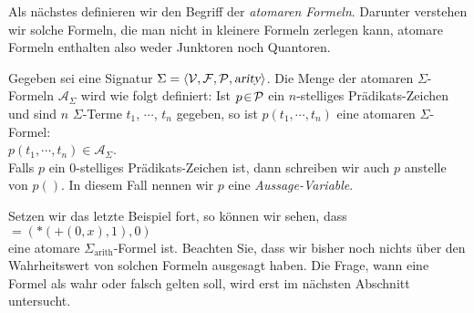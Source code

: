 Als n\"{a}chstes definieren wir den Begriff der \emph{atomaren Formeln}.  Darunter verstehen wir
solche Formeln, die man nicht in kleinere Formeln zerlegen kann, atomare Formeln enthalten also
weder Junktoren noch Quantoren. 
\begin{Definition}
  Gegeben sei eine Signatur $\Sigma = \langle \mathcal{V}, \mathcal{F}, \mathcal{P}, \textsl{arity} \rangle$. 
  Die Menge der atomaren $\Sigma$-Formeln $\mathcal{A}_\Sigma$
  wird wie folgt definiert:  Ist $p \!\in\! \mathcal{P}$ ein $n$-stelliges Pr\"{a}dikats-Zeichen
  und sind $n$ $\Sigma$-Terme $t_1$, $\cdots$, $t_n$ gegeben, so ist
  $p(t_1,\cdots,t_n)$ eine atomaren $\Sigma$-Formel: \\[0.2cm]
  \hspace*{1.3cm} $p(t_1,\cdots,t_n) \in \mathcal{A}_\Sigma$.  \\[0.2cm]
  Falls $p$ ein 0-stelliges Pr\"{a}dikats-Zeichen ist, dann schreiben wir auch $p$ anstelle von $p()$.
  In diesem Fall nennen wir $p$ eine \emph{Aussage-Variable}.
  \eox
\end{Definition}

\example
Setzen wir das letzte Beispiel fort, so k\"{o}nnen wir sehen, dass \\[0.2cm]
\hspace*{1.3cm} $\mathtt{=}(*(\mathtt{+}(0,x),1),0)$ \\[0.2cm]
eine atomare $\Sigma_\mathrm{arith}$-Formel ist.  Beachten Sie, dass wir bisher noch nichts \"{u}ber den Wahrheitswert von solchen 
Formeln ausgesagt haben.  Die Frage, wann eine Formel als wahr oder falsch gelten soll,
wird erst im n\"{a}chsten Abschnitt untersucht.
\eox

